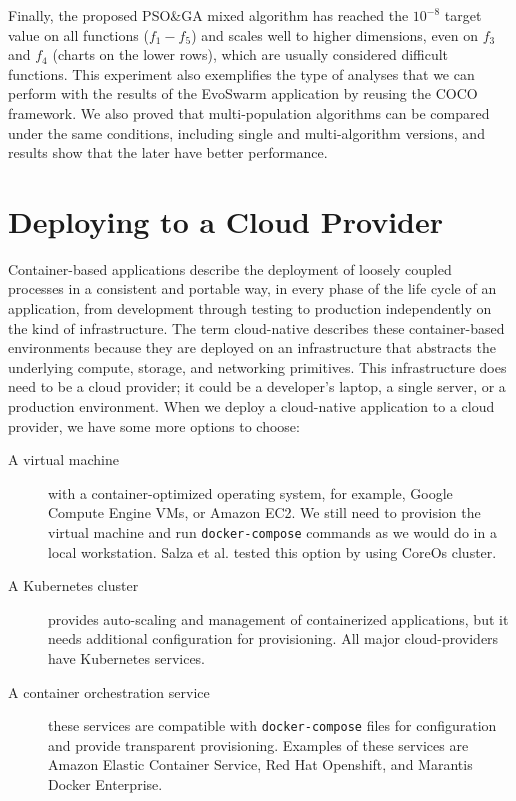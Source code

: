 \documentclass[review]{elsarticle}
\begin{document}
Finally, the proposed PSO\&GA mixed algorithm has reached the $10^{-8}$ target
value on all functions ($f_1-f_5$) and scales well to higher dimensions, even on
$f_3$ and $f_4$ (charts on the lower rows), which are usually considered
difficult functions. This experiment also exemplifies the type of analyses that
we can perform with the results of the EvoSwarm application by reusing the COCO framework.
We also proved that multi-population algorithms can be compared under the same 
conditions, including single and multi-algorithm versions, and results show 
that the later have better performance.


\section{Deploying to a Cloud Provider}
\label{cloud-aws}
Container-based applications describe the deployment of loosely coupled
processes in a consistent and portable way, in every phase of the life cycle of
an application, from development through testing to production independently on
the kind of infrastructure. The term cloud-native describes these
container-based environments because they are deployed on an infrastructure that
abstracts the underlying compute, storage, and networking primitives. This
infrastructure does need to be a cloud provider; it could be a developer's
laptop, a single server, or a production environment. When we deploy a
cloud-native application to a cloud provider, we have some more options to
choose:

\begin{description}
  
  \item[A virtual machine] with a container-optimized operating system, for example,
  Google Compute Engine VMs, or Amazon EC2.  We still need to provision the
  virtual machine and run {\tt docker-compose} commands as we would do in a local 
  workstation. Salza et al. \cite{salza2019speed} tested this option by using
  CoreOs cluster. 

  \item[A Kubernetes cluster] provides auto-scaling and management of containerized
  applications, but it needs additional configuration for provisioning. All major
  cloud-providers have Kubernetes services.

  \item[A container orchestration service] these services are compatible with {\tt docker-compose}
    files for configuration and provide transparent provisioning. Examples of these
    services are Amazon Elastic Container Service,  Red Hat Openshift, and Marantis Docker Enterprise.

\end{description}
\end{document}
